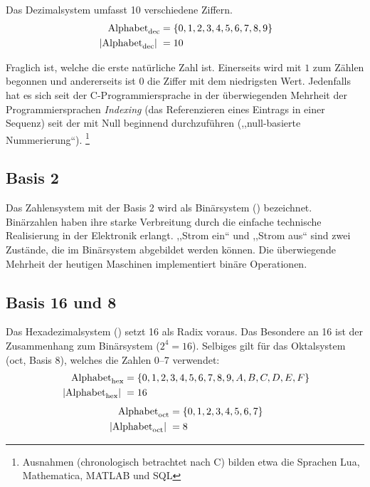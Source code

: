 Das Dezimalsystem umfasst 10 verschiedene Ziffern.
\begin{align*}
         \text{Alphabet}_{\text{dec}} &= \{0, 1, 2, 3, 4, 5, 6, 7, 8, 9\} \\
  \hspace{3pt}\left| \text{Alphabet}_{\text{dec}}\right|\hspace{3pt} &= 10 
\end{align*}

Fraglich ist, welche die erste natürliche Zahl ist. Einerseits wird mit $1$ zum
Zählen begonnen und andererseits ist $0$ die Ziffer mit dem niedrigsten Wert.
Jedenfalls hat es sich seit der C-Programmiersprache in der überwiegenden
Mehrheit der Programmiersprachen \emph{Indexing} (das Referenzieren eines
Eintrags in einer Sequenz) seit der mit Null beginnend durchzuführen
(,,null-basierte Nummerierung``).%
\footnote{Ausnahmen (chronologisch betrachtet nach C) bilden etwa die Sprachen
Lua, Mathematica, MATLAB und SQL}
%
\subsection{Basis 2}
%
Das Zahlensystem mit der Basis 2 wird als Binärsystem () bezeichnet.
Binärzahlen  haben ihre starke Verbreitung durch die einfache technische
Realisierung in der Elektronik erlangt. ,,Strom ein`` und ,,Strom aus``
sind zwei Zustände, die im Binärsystem abgebildet werden können.
Die überwiegende Mehrheit der heutigen Maschinen
implementiert binäre Operationen.
%
\subsection{Basis 16 und 8}
%
Das Hexadezimalsystem () setzt 16 als Radix voraus. Das Besondere an
16 ist der Zusammenhang zum Binärsystem ($2^4 = 16$). Selbiges gilt für
das Oktalsystem (oct, Basis 8), welches die Zahlen 0--7 verwendet:
%
\begin{align*}
  \text{Alphabet}_{\text{hex}} &= \{0, 1, 2, 3, 4, 5, 6, 7, 8, 9, A, B, C, D, E, F\} \\
  \hspace{3pt}\left| \text{Alphabet}_{\text{hex}}\right|\hspace{3pt} &= 16 
\end{align*}
%
\begin{align*}
  \text{Alphabet}_{\text{oct}} &= \{0, 1, 2, 3, 4, 5, 6, 7\} \\
  \hspace{3pt}\left| \text{Alphabet}_{\text{oct}}\right|\hspace{3pt} &= 8
\end{align*}
%
